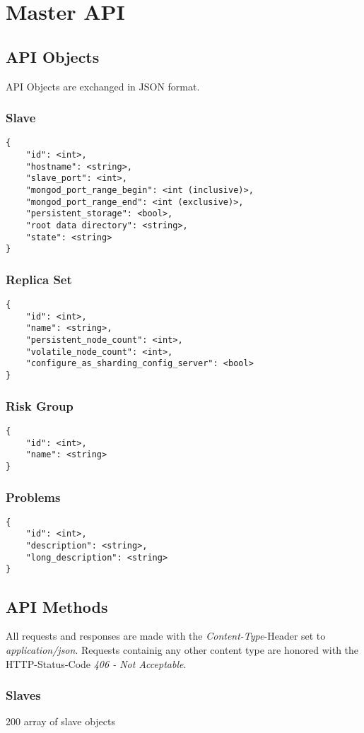 \section{Master API}
\subsection{API Objects}
API Objects are exchanged in JSON format.
\subsubsection{Slave}
\begin{lstlisting}
{
	"id": <int>,
	"hostname": <string>,
	"slave_port": <int>,
	"mongod_port_range_begin": <int (inclusive)>,
	"mongod_port_range_end": <int (exclusive)>,
	"persistent_storage": <bool>,
	"root data directory": <string>,
	"state": <string>
}
\end{lstlisting}
\subsubsection{Replica Set}
\begin{lstlisting}
{
	"id": <int>,
	"name": <string>,
	"persistent_node_count": <int>,
	"volatile_node_count": <int>,
	"configure_as_sharding_config_server": <bool>
}
\end{lstlisting}
\subsubsection{Risk Group}
\begin{lstlisting}
{
	"id": <int>,
	"name": <string>
}
\end{lstlisting}
\subsubsection{Problems}
\begin{lstlisting}
{
	"id": <int>,
	"description": <string>,
	"long_description": <string>
}
\end{lstlisting}
\subsection{API Methods}
All requests and responses are made with the \emph{Content-Type}-Header set to \emph{application/json}. Requests containig any other content type are honored with the HTTP-Status-Code \emph{406 - Not Acceptable}.
\subsubsection{Slaves}
	{}
	{200}
	{}
	{array of slave objects}
	{}

